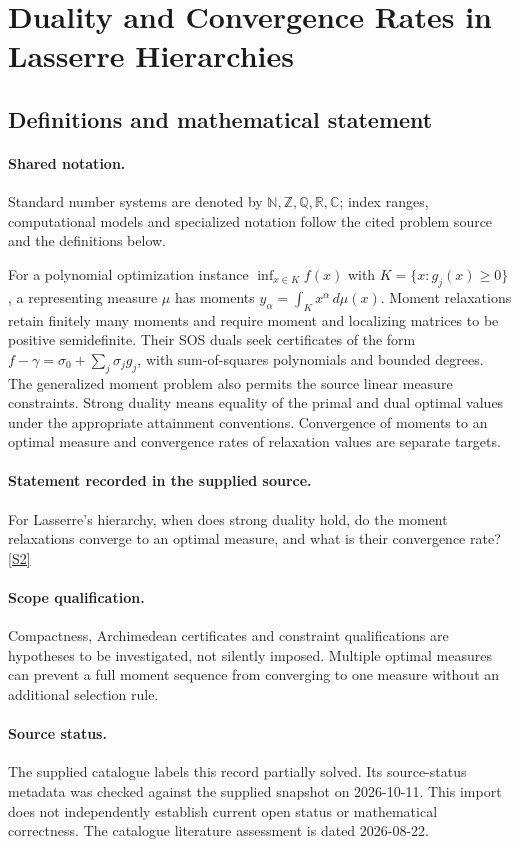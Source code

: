 \documentclass[11pt]{article}
\newcommand{\sref}[2]{\hyperlink{source:#1:#2}{[S#2]}}
\begin{document}
\section{Duality and Convergence Rates in Lasserre Hierarchies}\label{statement}

\subsection{Definitions and mathematical statement}

\paragraph{Shared notation.}Standard number systems are denoted by $\mathbb N,\mathbb Z,\mathbb Q,\mathbb R,\mathbb C$; index ranges, computational models and specialized notation follow the cited problem source and the definitions below.


For a polynomial optimization instance $\inf_{x\in K}f(x)$ with $K=\{x:g_j(x)\geq0\}$, a representing measure $\mu$ has moments $y_\alpha=\int_K x^\alpha\,d\mu(x)$. Moment relaxations retain finitely many moments and require moment and localizing matrices to be positive semidefinite. Their SOS duals seek certificates of the form $f-\gamma=\sigma_0+\sum_j\sigma_jg_j$, with sum-of-squares polynomials and bounded degrees. The generalized moment problem also permits the source linear measure constraints. Strong duality means equality of the primal and dual optimal values under the appropriate attainment conventions. Convergence of moments to an optimal measure and convergence rates of relaxation values are separate targets.
\paragraph{Statement recorded in the supplied source.}
For Lasserre's hierarchy, when does strong duality hold, do the moment relaxations converge to an optimal measure, and what is their convergence rate? \sref{statement}{2}
\paragraph{Scope qualification.}
Compactness, Archimedean certificates and constraint qualifications are hypotheses to be investigated, not silently imposed. Multiple optimal measures can prevent a full moment sequence from converging to one measure without an additional selection rule.
\paragraph{Source status.}
The supplied catalogue labels this record partially solved. Its source-status metadata was checked against the supplied snapshot on 2026-10-11. This import does not independently establish current open status or mathematical correctness. The catalogue literature assessment is dated 2026-08-22.
\end{document}
